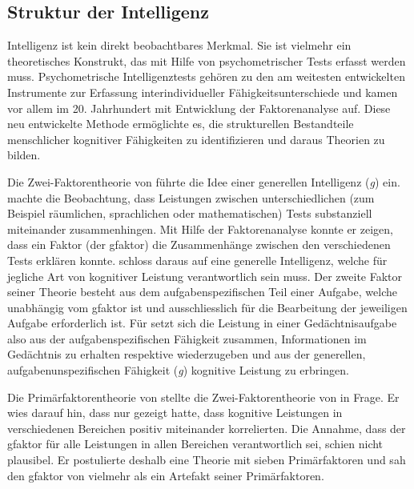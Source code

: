\documentclass[11pt, twoside, a4paper]{book}		%
\begin{document}
\subsection{Struktur der Intelligenz}

Intelligenz ist kein direkt beobachtbares Merkmal. Sie ist vielmehr ein theoretisches Konstrukt, das mit Hilfe von psychometrischer Tests erfasst werden muss. Psychometrische Intelligenztests gehören zu den am weitesten entwickelten Instrumente zur Erfassung interindividueller Fähigkeitsunterschiede und kamen  vor allem im 20. Jahrhundert mit Entwicklung der Faktorenanalyse \citep{Spearman1904} auf. Diese neu entwickelte Methode ermöglichte es, die strukturellen Bestandteile menschlicher kognitiver Fähigkeiten zu identifizieren und daraus Theorien zu bilden.

Die Zwei-Faktorentheorie von \citet{Spearman1904, Spearman1927} führte die Idee einer generellen Intelligenz (\textit{g}) ein. \citeauthor{Spearman1904} machte die Beobachtung, dass Leistungen zwischen unterschiedlichen (zum Beispiel räumlichen, sprachlichen oder mathematischen) Tests substanziell miteinander zusammenhingen. Mit Hilfe der Faktorenanalyse konnte er zeigen, dass ein Faktor (der \gls{gfaktor}) die Zusammenhänge zwischen den verschiedenen Tests erklären konnte. \citeauthor{Spearman1904} schloss daraus auf eine generelle Intelligenz, welche für jegliche Art von kognitiver Leistung verantwortlich sein muss. Der zweite Faktor seiner Theorie besteht aus dem aufgabenspezifischen Teil einer Aufgabe, welche unabhängig vom \gls{gfaktor} ist und ausschliesslich für die Bearbeitung der jeweiligen Aufgabe erforderlich ist. Für \citeauthor{Spearman1904} setzt sich die Leistung in einer Gedächtnisaufgabe also aus der aufgabenspezifischen Fähigkeit zusammen, Informationen im Gedächtnis zu erhalten respektive wiederzugeben und aus der generellen, aufgabenunspezifischen Fähigkeit (\textit{g}) kognitive Leistung zu erbringen.

Die Primärfaktorentheorie von \citet{Thurstone1938} stellte die Zwei-Fak\-tor\-en\-theo\-rie von \citet{Spearman1904, Spearman1927} in Frage. Er wies darauf hin, dass  \citeauthor{Spearman1904} nur gezeigt hatte, dass kognitive Leistungen in verschiedenen Bereichen positiv miteinander korrelierten. Die Annahme, dass der \gls{gfaktor} für alle Leistungen in allen Bereichen verantwortlich sei, schien \citeauthor{Thurstone1938} nicht plausibel. 
Er postulierte deshalb eine Theorie mit sieben Primärfaktoren und sah den \gls{gfaktor} von \citeauthor{Spearman1904} vielmehr als ein Artefakt seiner Primärfaktoren. 
\end{document}
